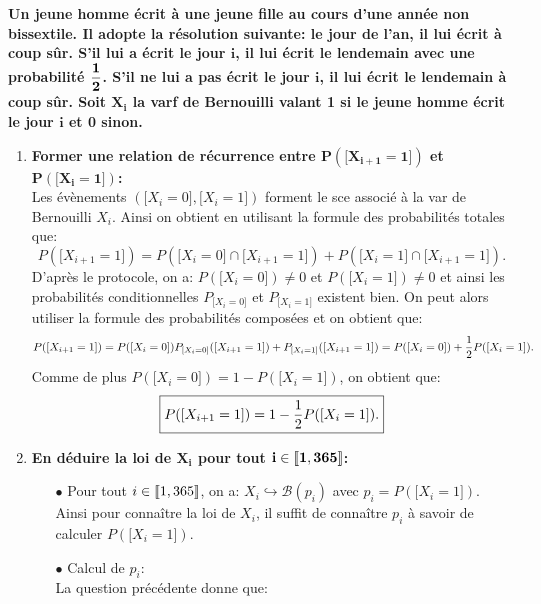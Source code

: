 \documentclass[a4paper, 11pt,reqno]{article}
\begin{document}
\begin{correction}  \;
	\textbf{Un jeune homme \'ecrit \`a une jeune fille au cours d'une ann\'ee non bissextile. Il adopte la r\'esolution suivante: le jour de l'an, il lui \'ecrit \`a coup s\^ur. S'il lui a \'ecrit le jour $\mathbf{i}$, il lui \'ecrit le lendemain avec une probabilit\'e $\mathbf{\displaystyle\frac{1}{2}}$. S'il ne lui a pas \'ecrit le jour $\mathbf{i}$, il lui \'ecrit le lendemain \`a coup s\^ur. Soit $\mathbf{X_i}$ la varf de Bernouilli valant 1 si le jeune homme \'ecrit le jour $\mathbf{i}$ et 0 sinon.}
	\begin{enumerate}
		\item \textbf{Former une relation de r\'ecurrence entre $\mathbf{P(\lbrack X_{i+1}=1\rbrack)}$ et $\mathbf{P(\lbrack X_{i}=1\rbrack)}$:}\\
		      \noindent Les \'ev\`{e}nements $(\lbrack X_i=0\rbrack,\lbrack X_i=1\rbrack)$ forment le sce associ\'e \`{a} la var de Bernouilli $X_i$. Ainsi on obtient en utilisant la formule des probabilit\'es totales que:
		      $$P(\lbrack X_{i+1}=1\rbrack)=P(\lbrack X_i=0\rbrack\cap \lbrack X_{i+1}=1\rbrack)+P(\lbrack X_i=1\rbrack\cap \lbrack X_{i+1}=1\rbrack).$$
		      D'apr\`{e}s le protocole, on a: $P(\lbrack X_i=0\rbrack)\not= 0$ et $P(\lbrack X_i=1\rbrack)\not= 0$ et ainsi les probabilit\'es conditionnelles $P_{\lbrack X_i=0\rbrack}$ et $P_{\lbrack X_i=1\rbrack}$ existent bien. On peut alors utiliser la formule des probabilit\'es compos\'ees et on obtient que:
		      $$P(\lbrack X_{i+1}=1\rbrack)=P(\lbrack X_i=0\rbrack)P_{\lbrack X_i=0\rbrack}( \lbrack X_{i+1}=1\rbrack)+P_{\lbrack X_i=1\rbrack}(\lbrack X_{i+1}=1\rbrack)=P(\lbrack X_i=0\rbrack)+\displaystyle\frac{1}{2} P(\lbrack X_i=1\rbrack).$$
		      Comme de plus $P(\lbrack X_i=0\rbrack)=1-P(\lbrack X_i=1\rbrack)$, on obtient que:
		      $$\fbox{$P(\lbrack X_{i+1}=1\rbrack)=1-\displaystyle\frac{1}{2} P(\lbrack X_i=1\rbrack).$}$$
		\item \textbf{En d\'eduire la loi de $\mathbf{X_i}$ pour tout $\mathbf{i\in\llbracket  1,365\rrbracket}$:}
		      \begin{itemize}
			      \item[$\bullet$] Pour tout $i\in\llbracket  1,365\rrbracket$, on a: $X_i\hookrightarrow \mathcal{B}(p_i)$ avec $p_i=P(\lbrack X_i=1\rbrack)$. Ainsi pour conna\^{i}tre la loi de $X_i$, il suffit de conna\^{i}tre $p_i$ \`{a} savoir de calculer $P(\lbrack X_i=1\rbrack)$.
			      \item[$\bullet$] Calcul de $p_i$:\\
				      \noindent La question pr\'ec\'edente donne que:

\end{itemize}
\end{enumerate}
\end{correction}
\end{document}
